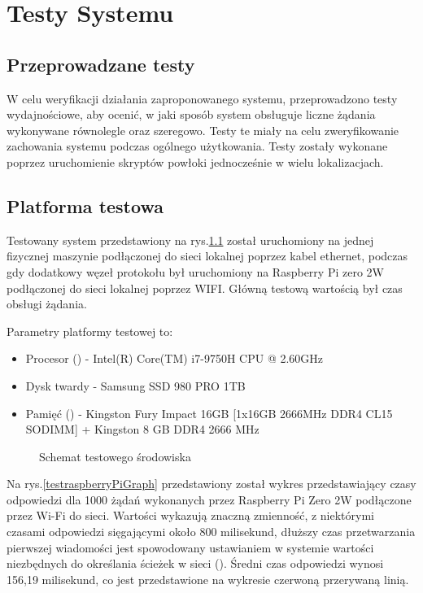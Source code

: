 \chapter{Testy Systemu}

\section{Przeprowadzane testy}

W celu weryfikacji działania zaproponowanego systemu, przeprowadzono testy wydajnościowe, aby ocenić, w jaki sposób system obsługuje liczne żądania wykonywane równolegle oraz szeregowo. Testy te miały na celu zweryfikowanie zachowania systemu podczas ogólnego użytkowania. Testy zostały wykonane poprzez uruchomienie skryptów powłoki jednocześnie w wielu lokalizacjach.

\section{Platforma testowa}

Testowany system przedstawiony na rys.\ref{testowySystemSchemat} został uruchomiony na jednej fizycznej maszynie podłączonej do sieci lokalnej poprzez kabel ethernet, podczas gdy dodatkowy węzeł protokołu był uruchomiony na Raspberry Pi zero 2W podłączonej do sieci lokalnej poprzez WIFI. Główną testową wartością był czas obsługi żądania.

Parametry platformy testowej to:

\begin{itemize}
    \item Procesor  () - Intel(R) Core(TM) i7-9750H CPU @ 2.60GHz
    \item Dysk twardy - Samsung SSD 980 PRO 1TB
    \item Pamięć  () - Kingston Fury Impact 16GB [1x16GB 2666MHz DDR4 CL15 SODIMM] + Kingston 8 GB DDR4 2666 MHz
\end{itemize}


\begin{figure}
    \centering
    
    \caption{Schemat testowego środowiska}
    \label{testowySystemSchemat}
\end{figure}

Na rys.\ref{testraspberryPiGraph} przedstawiony został wykres przedstawiający czasy odpowiedzi dla 1000 żądań wykonanych przez Raspberry Pi Zero 2W podłączone przez Wi-Fi do sieci. Wartości wykazują znaczną zmienność, z niektórymi czasami odpowiedzi sięgającymi około 800 milisekund, dłuższy czas przetwarzania pierwszej wiadomości jest spowodowany ustawianiem w systemie wartości niezbędnych do określania ścieżek w sieci  (). Średni czas odpowiedzi wynosi 156,19 milisekund, co jest przedstawione na wykresie czerwoną przerywaną linią.

